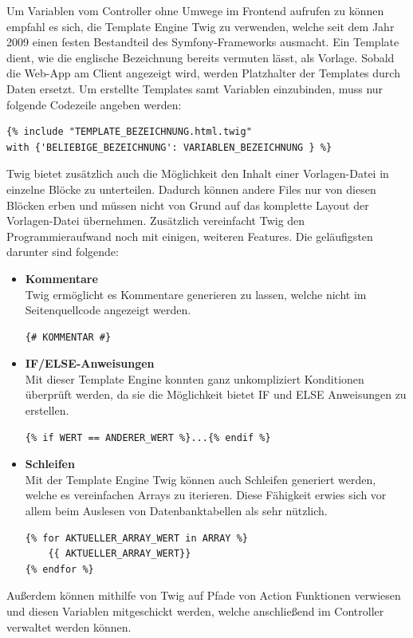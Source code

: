 Um Variablen vom Controller ohne Umwege im Frontend aufrufen zu können empfahl es sich, die Template Engine {Twig\cite{twig}} zu verwenden, welche seit dem Jahr 2009 einen festen Bestandteil des Symfony-Frameworks ausmacht. Ein Template dient, wie die englische Bezeichnung bereits vermuten lässt, als Vorlage. Sobald die Web-App am Client angezeigt wird, werden Platzhalter der Templates durch Daten ersetzt. 
Um erstellte Templates samt Variablen einzubinden, muss nur folgende Codezeile angeben werden:
	\lstset{language = php}
  	\begin{lstlisting}
{% include "TEMPLATE_BEZEICHNUNG.html.twig" 
with {'BELIEBIGE_BEZEICHNUNG': VARIABLEN_BEZEICHNUNG } %}
  	\end{lstlisting}
Twig bietet zusätzlich auch die Möglichkeit den Inhalt einer Vorlagen-Datei in einzelne Blöcke zu unterteilen. Dadurch können andere Files nur von diesen Blöcken erben und müssen nicht von Grund auf das komplette Layout der Vorlagen-Datei übernehmen.
Zusätzlich vereinfacht Twig den Programmieraufwand noch mit einigen, weiteren Features. Die geläufigsten darunter sind folgende:
\begin{itemize}
    \item \textbf{Kommentare}\\
Twig ermöglicht es Kommentare generieren zu lassen, welche nicht im Seitenquellcode angezeigt werden. 
\lstset{language = html}
  	\begin{lstlisting}
{# KOMMENTAR #}
	\end{lstlisting}
    \item \textbf{IF/ELSE-Anweisungen}\\
Mit dieser Template Engine konnten ganz unkompliziert Konditionen überprüft werden, da sie die Möglichkeit bietet IF und ELSE Anweisungen zu erstellen.
\lstset{language = php}
  	\begin{lstlisting}
{% if WERT == ANDERER_WERT %}...{% endif %}
	\end{lstlisting}
    \item \textbf{Schleifen}\\
Mit der Template Engine Twig können auch Schleifen generiert werden, welche es vereinfachen Arrays zu iterieren. Diese Fähigkeit erwies sich vor allem beim Auslesen von Datenbanktabellen als sehr nützlich.
\lstset{language = php}
  	\begin{lstlisting}
{% for AKTUELLER_ARRAY_WERT in ARRAY %}
	{{ AKTUELLER_ARRAY_WERT}}
{% endfor %}
	\end{lstlisting}
  \end{itemize}  
Außerdem können mithilfe von Twig auf Pfade von Action Funktionen verwiesen und diesen Variablen mitgeschickt werden, welche anschließend im Controller verwaltet werden können.


